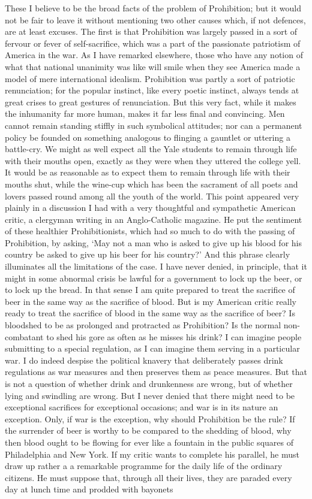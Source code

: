 \documentclass{book}
\begin{document}
These I believe to be the broad facts of the problem of Prohibition; but it would not be fair to leave it without mentioning two other causes which, if not defences, are at least excuses. The first is that Prohibition was largely passed in a sort of fervour or fever of self-sacrifice, which was a part of the passionate patriotism of America in the war. As I have remarked elsewhere, those who have any notion of what that national unanimity was like will smile when they see America made a model of mere international idealism. Prohibition was partly a sort of patriotic renunciation; for the popular instinct, like every poetic instinct, always tends at great crises to great gestures of renunciation. But this very fact, while it makes the inhumanity far more human, makes it far less final and convincing. Men cannot remain standing stiffly in such symbolical attitudes; nor can a permanent policy be founded on something analogous to flinging a gauntlet or uttering a battle-cry. We might as well expect all the Yale students to remain through life with their mouths open, exactly as they were when they uttered the college yell. It would be as reasonable as to expect them to remain through life with their mouths shut, while the wine-cup which has been the sacrament of all poets and lovers passed round among all the youth of the world. This point appeared very plainly in a discussion I had with a very thoughtful and sympathetic American critic, a clergyman writing in an Anglo-Catholic magazine. He put the sentiment of these healthier Prohibitionists, which had so much to do with the passing of Prohibition, by asking, ‘May not a man who is asked to give up his blood for his country be asked to give up his beer for his country?’ And this phrase clearly illuminates all the limitations of the case. I have never denied, in principle, that it might in some abnormal crisis be lawful for a government to lock up the beer, or to lock up the bread. In that sense I am quite prepared to treat the sacrifice of beer in the same way as the sacrifice of blood. But is my American critic really ready to treat the sacrifice of blood in the same way as the sacrifice of beer? Is bloodshed to be as prolonged and protracted as Prohibition? Is the normal non-combatant to shed his gore as often as he misses his drink? I can imagine people submitting to a special regulation, as I can imagine them serving in a particular war. I do indeed despise the political knavery that deliberately passes drink regulations as war measures and then preserves them as peace measures. But that is not a question of whether drink and drunkenness are wrong, but of whether lying and swindling are wrong. But I never denied that there might need to be exceptional sacrifices for exceptional occasions; and war is in its nature an exception. Only, if war is the exception, why should Prohibition be the rule? If the surrender of beer is worthy to be compared to the shedding of blood, why then blood ought to be flowing for ever like a fountain in the public squares of Philadelphia and New York. If my critic wants to complete his parallel, he must draw up rather a a remarkable programme for the daily life of the ordinary citizens. He must suppose that, through all their lives, they are paraded every day at lunch time and prodded with bayonets 
\end{document}
